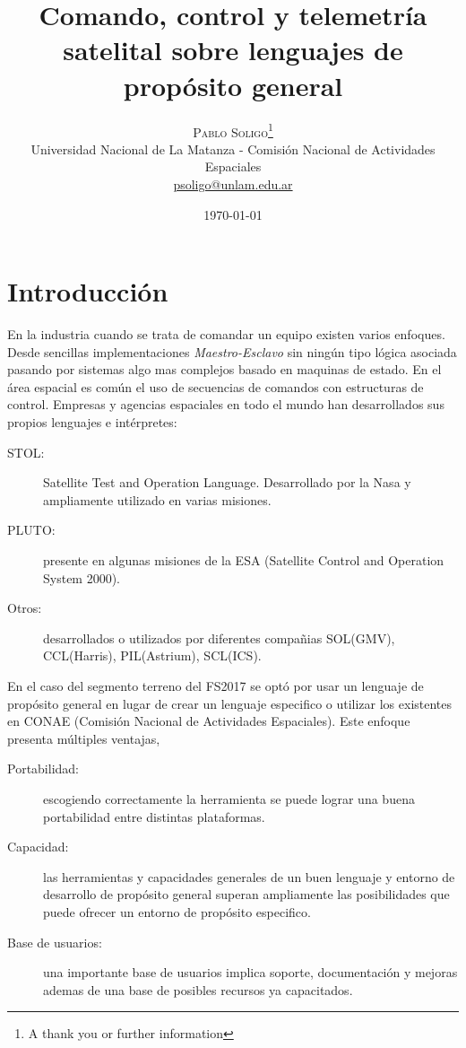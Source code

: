 \documentclass[twoside,twocolumn]{article}
\title{Comando, control y telemetría satelital sobre lenguajes de propósito general} %
\author{%
\textsc{Pablo Soligo}\thanks{A thank you or further information} \\[1ex] %
\normalsize Universidad Nacional de La Matanza - Comisión Nacional de Actividades Espaciales \\ %
\normalsize \href{mailto:psoligo@unlam.edu.ar}{psoligo@unlam.edu.ar} %
}
\date{\today} %
\begin{document}
\maketitle


\section{Introducción}

En la industria cuando se trata de comandar un equipo existen varios enfoques. Desde sencillas implementaciones \textit{Maestro-Esclavo} sin ningún tipo lógica asociada pasando por sistemas algo mas complejos basado en maquinas de estado. En el área espacial es común el uso de secuencias de comandos con estructuras de control. Empresas y agencias espaciales en todo el mundo han desarrollados sus propios lenguajes e intérpretes: 

\begin{description}
 \item [STOL:] Satellite Test and Operation Language. Desarrollado por la Nasa y ampliamente utilizado en varias misiones. 
 \item [PLUTO:] presente en algunas misiones de la ESA (Satellite Control and Operation System 2000).
 \item [Otros:] desarrollados o utilizados por diferentes compañias  SOL(GMV), CCL(Harris), PIL(Astrium), SCL(ICS). 
\end{description}


En el caso del segmento terreno del FS2017 se optó por usar un lenguaje de propósito general en lugar de crear un lenguaje  especifico o utilizar los existentes en CONAE (Comisión Nacional de Actividades Espaciales). Este enfoque presenta múltiples ventajas, 

\begin{description}
 \item [Portabilidad: ] escogiendo correctamente la herramienta se puede lograr una buena portabilidad entre distintas plataformas.
 \item [Capacidad: ] las herramientas y capacidades generales de un buen lenguaje y entorno de desarrollo de propósito general superan ampliamente las posibilidades que puede ofrecer un entorno de propósito especifico.
 \item [Base de usuarios: ] una importante base de usuarios implica soporte, documentación y mejoras ademas de una base de posibles recursos ya capacitados. 
\end{description}
\end{document}
